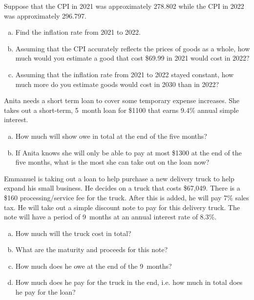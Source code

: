 \documentclass[11pt,letterpaper]{article}
\begin{document}

 Suppose that the CPI in 2021 was approximately 278.802 while the CPI in 2022 was approximately 296.797. 
	\begin{enumerate}[(a)]
	\item Find the inflation rate from 2021 to 2022. 
	\item Assuming that the CPI accurately reflects the prices of goods as a whole, how much would you estimate a good that cost \$69.99 in 2021 would cost in 2022?
	\item Assuming that the inflation rate from 2021 to 2022 stayed constant, how much more do you estimate goods would cost in 2030 than in 2022?
	\end{enumerate}



\newpage



 Anita needs a short term loan to cover some temporary expense increases. She takes out a short-term, 5~month loan for \$1100 that earns 9.4\% annual simple interest. 
	\begin{enumerate}[(a)]
	\item How much will show owe in total at the end of the five months?
	\item If Anita knows she will only be able to pay at most \$1300 at the end of the five months, what is the most she can take out on the loan now?
	\end{enumerate}



\newpage



 Emmanuel is taking out a loan to help purchase a new delivery truck to help expand his small business. He decides on a truck that costs \$67,049. There is a \$160 processing/service fee for the truck. After this is added, he will pay 7\% sales tax. He will take out a simple discount note to pay for this delivery truck. The note will have a period of 9~months at an annual interest rate of 8.3\%.
	\begin{enumerate}[(a)]
	\item How much will the truck cost in total?
	\item What are the maturity and proceeds for this note?
	\item How much does he owe at the end of the 9~months?
	\item How much does he pay for the truck in the end, i.e. how much in total does he pay for the loan?
	\end{enumerate}
\end{document}
